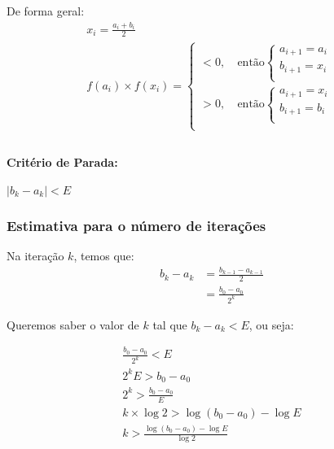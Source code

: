 \documentclass{article}
\begin{document}
        De forma geral:
        \begin{gather*}
            x_i = \frac{a_i + b_i}{2}\\
            f(a_i) \times f(x_i) =
                \begin{cases}
                    < 0,~ & \text{então}
                        \begin{cases}
                            a_{i+1} = a_i\\
                            b_{i+1} = x_i\\
                        \end{cases}\\
                    > 0,~ & \text{então}
                        \begin{cases}
                            a_{i+1} = x_i\\
                            b_{i+1} = b_i\\
                        \end{cases}\\
                \end{cases}\\
        \end{gather*}

        \paragraph{Critério de Parada:} $|b_k - a_k| < E$

        \subsubsection*{Estimativa para o número de iterações}
        Na iteração $k$, temos que:
        \begin{align*}
            b_k - a_k &= \frac{b_{k-1} - a_{k-1}}{2}\\
            &= \frac{b_0 - a_0}{2^k}
        \end{align*}

        Queremos saber o valor de $k$ tal que $b_k - a_k < E$, ou seja:

        \begin{gather*}
            \frac{b_0 - a_0}{2^k} < E\\
            2^k E > b_0 - a_0\\
            2^k > \frac{b_0 - a_0}{E}\\
            k \times \log{2} > \log{(b_0 - a_0)} - \log{E}\\
            \boxed{k > \frac{\log{(b_0 - a_0)} - \log{E}}{\log{2}}}
        \end{gather*}
\end{document}

